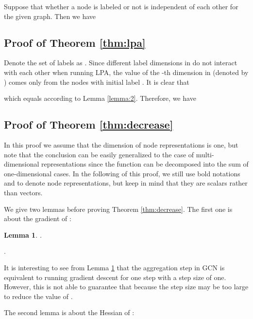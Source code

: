 \documentclass{article}
\newtheorem{lemma}{Lemma}
\newenvironment{proof}{{\noindent\it Proof.}\quad}{\hfill \par}
\begin{document}
		\begin{proof}
			Suppose that whether a node is labeled or not is independent of each other for the given graph.
			Then we have
			
		\end{proof}
	
	
	\subsection{Proof of Theorem \ref{thm:lpa}}
	\label{app:c}
		\begin{proof}
			Denote the set of labels as .
			Since different label dimensions in  do not interact with each other when running LPA, the value of the -th dimension in  (denoted by ) comes only from the nodes with initial label .
			It is clear that
			
			which equals  according to Lemma \ref{lemma:2}.
			Therefore, we have
			
		\end{proof}
	
	
	\subsection{Proof of Theorem \ref{thm:decrease}}
	\label{app:d}
		In this proof we assume that the dimension of node representations is one, but note that the conclusion can be easily generalized to the case of multi-dimensional representations since the function  can be decomposed into the sum of one-dimensional cases.
		In the following of this proof, we still use bold notations  and  to denote node representations, but keep in mind that they are scalars rather than vectors.
		
		We give two lemmas before proving Theorem \ref{thm:decrease}.
		The first one is about the gradient of :
		\begin{lemma}
		\label{lemma:3}
			.
		\end{lemma}
		
		\begin{proof}
			.
		\end{proof}
		
		It is interesting to see from Lemma \ref{lemma:3} that the aggregation step in GCN is equivalent to running gradient descent for one step with a step size of one.
		However, this is not able to guarantee that  because the step size may be too large to reduce the value of .
		
		The second lemma is about the Hessian of :
		
\end{document}
